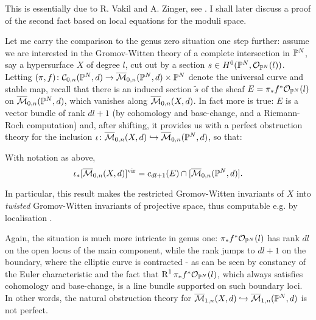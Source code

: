 This is essentially due to R. Vakil and A. Zinger, see \cite[Lemma~5.9]{Vre} \cite[\S 1.2]{VZ}. I shall later discuss a proof of the second fact based on local equations for the moduli space.

Let me carry the comparison to the genus zero situation one step further: assume we are interested in the Gromov-Witten theory of a complete intersection in $\mathbb P^N$, say a hypersurface $X$ of degree $l$, cut out by a section $s\in H^0(\mathbb P^N,\mathcal{O}_{\mathbb P^N}(l))$. Letting $(\pi,f)\colon \mathcal C_{0,n}(\mathbb P^N,d) \rightarrow \overline{\mathcal{M}}_{0,n}(\mathbb P^N,d)\times \mathbb P^N$ denote the universal curve and stable map, recall that there is an induced section $\tilde{s}$ of the sheaf $E=\pi_*f^*\mathcal{O}_{\mathbb P^N}(l)$ on $\overline{\mathcal{M}}_{0,n}(\mathbb P^N,d)$, which vanishes along $\overline{\mathcal{M}}_{0,n}(X,d)$. In fact more is true: $E$ is a vector bundle of rank $dl+1$ (by cohomology and base-change, and a Riemann-Roch computation) and, after shifting, it provides us with a perfect obstruction theory for the inclusion $\iota\colon \overline{\mathcal{M}}_{0,n}(X,d)\hookrightarrow\overline{\mathcal{M}}_{0,n}(\mathbb P^N,d)$, so that:

\begin{prop}\cite{CKL,KKP}
 With notation as above,
 \[\iota_*[\overline{\mathcal{M}}_{0,n}(X,d)]^{\mathrm{vir}}=c_{dl+1}(E)\cap [\overline{\mathcal{M}}_{0,n}(\mathbb P^N,d)].\]
\end{prop}
In particular, this result makes the restricted Gromov-Witten invariants of $X$ into \emph{twisted} Gromov-Witten invariants of projective space, thus computable e.g. by localisation \cite{KON}.

Again, the situation is much more intricate in genus one: $\pi_*f^*\mathcal{O}_{\mathbb P^N}(l)$ has rank $dl$ on the open locus of the main component, while the rank jumps to $dl+1$ on the boundary, where the elliptic curve is contracted - as can be seen by constancy of the Euler characteristic and the fact that $\operatorname{R}^1\pi_*f^*\mathcal{O}_{\mathbb P^N}(l)$, which always satisfies cohomology and base-change, is a line bundle supported on such boundary loci. In other words, the natural obstruction theory for $\overline{\mathcal{M}}_{1,n}(X,d)\hookrightarrow\overline{\mathcal{M}}_{1,n}(\mathbb P^N,d)$ is not perfect.

